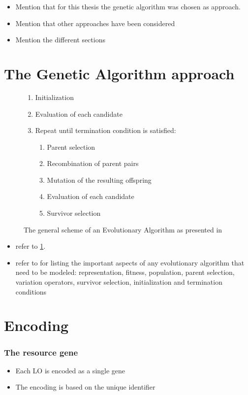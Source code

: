 \begin{itemize}
	\item Mention that for this thesis the genetic algorithm was chosen as
		approach.
	\item Mention that other approaches have been considered
	\item Mention the different sections
\end{itemize}
\section{The Genetic Algorithm approach}
\begin{figure}[ht!]
	\begin{framed}
		\begin{enumerate}
			\item Initialization
			\item Evaluation of each candidate
			\item Repeat until termination condition is satisfied:
				\begin{enumerate}
					\item Parent selection
					\item Recombination of parent pairs
					\item Mutation of the resulting offspring
					\item Evaluation of each candidate
					\item Survivor selection
				\end{enumerate}
		\end{enumerate}
	\end{framed}
	\caption[The evolutionary algorithm]{The general scheme of an
		Evolutionary Algorithm as presented in \citep{Eiben2007}}
	\label{alg:ea_scheme}
\end{figure}
\begin{itemize}
	\item refer to \ref{alg:ea_scheme}.
	\item refer to \citep{Eiben2007} for listing the important aspects of any evolutionary algorithm that need to be modeled: representation, fitness, population, parent selection, variation operators, survivor selection, initialization and termination conditions
\end{itemize}
\section{Encoding}
\subsubsection{The resource gene}
\begin{itemize}
	\item Each LO is encoded as a single gene
	\item The encoding is based on the unique identifier
\end{itemize}
